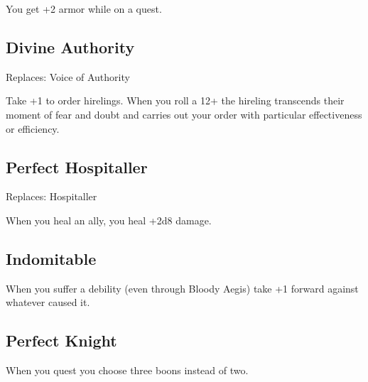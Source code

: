 You get +2 armor while on a quest.
\subsection{Divine Authority}

Replaces: Voice of Authority

Take +1 to order hirelings. When you roll a 12+ the hireling transcends their moment of fear and doubt and carries out your order with particular effectiveness or efficiency.
\subsection{Perfect Hospitaller}

Replaces: Hospitaller

When you heal an ally, you heal +2d8 damage.
\subsection{Indomitable}

When you suffer a debility (even through Bloody Aegis) take +1 forward against whatever caused it.
\subsection{Perfect Knight}

When you quest you choose three boons instead of two.


